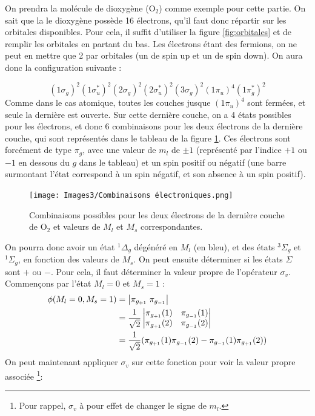 On prendra la molécule de dioxygène (O$_2$) comme exemple pour cette partie.
On sait que la le dioxygène possède 16 électrons, qu'il faut donc répartir sur les orbitales disponibles. Pour cela, il suffit d'utiliser la figure \ref{fig:orbitales} et de remplir les orbitales en partant du bas. Les électrons étant des fermions, on ne peut en mettre que 2 par orbitales (un de spin up et un de spin down). On aura donc la configuration suivante :

\[
    (1\sigma_g)^2(1\sigma^*_u)^2(2\sigma_g)^2(2\sigma^*_u)^2(3\sigma_g)^2(1\pi_u)^4(1\pi^*_g)^2
\]
Comme dans le cas atomique, toutes les couches jusque $(1\pi_u)^4$ sont fermées, et seule la dernière est ouverte. Sur cette dernière couche, on a 4 états possibles pour les électrons, et donc 6 combinaisons pour les deux électrons de la dernière couche, qui sont représentés dans le tableau de la figure \ref{fig:Combinaisons}. Ces électrons sont forcément de type $\pi_g$, avec une valeur de $m_l$ de $\pm1$ (représenté par l'indice $+1$ ou $-1$ en dessous du $g$ dans le tableau) et un spin positif ou négatif (une barre surmontant l'état correspond à un spin négatif, et son absence à un spin positif).
\begin{figure}[htpb]
    \centering
    \texttt{[image: Images3/Combinaisons électroniques.png]}
    \caption{Combinaisons possibles pour les deux électrons de la dernière couche de O$_2$ et valeurs de $M_l$ et $M_s$ correspondantes.}
    \label{fig:Combinaisons}
\end{figure}
On pourra donc avoir un état $^1\Delta_g$ dégénéré en $M_l$ (en bleu), et des états $^3\Sigma_g$ et $^1\Sigma_g$, en fonction des valeurs de $M_s$. On peut ensuite déterminer si les états $\Sigma$ sont $+$ ou $-$. Pour cela, il faut déterminer la valeur propre de l'opérateur $\sigma_v$. Commençons par l'état $M_l = 0$ et $M_s=1$ :
\begin{align*}
    \phi(M_l=0, M_s=1) &= \abs{\pi_{g_{+1}}\;\pi_{g_{-1}}}\\
    &= \dfrac{1}{\sqrt{2}}
    \begin{vmatrix}
        \pi_{g_{+1}}(1) & \pi_{g_{-1}}(1)\\
        \pi_{g_{+1}}(2) & \pi_{g_{-1}}(2)\\
    \end{vmatrix}\\
    &= \dfrac{1}{\sqrt{2}}(\pi_{g_{+1}}(1)\pi_{g_{-1}}(2)-\pi_{g_{-1}}(1)\pi_{g_{+1}}(2))\\
\end{align*}
On peut maintenant appliquer $\sigma_v$ sur cette fonction pour voir la valeur propre associée \footnote{Pour rappel, $\sigma_v$ à pour effet de changer le signe de $m_l$.}:

